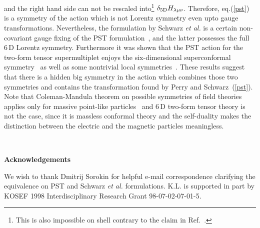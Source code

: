 \documentclass[a4paper,12pt]{article}
\renewcommand{\thesection}{\Roman{section}.}
\renewcommand{\theequation}{\thesection\arabic{equation}}
\begin{document}
and the right hand side can not be rescaled into\footnote{This is also impossible on shell contrary to the claim in Ref.~\cite{9611065}.}  $\delta_{5{\rm D}}H_{\lambda\mu\nu}$.  Therefore,  eq.(\ref{pst}) is  a  symmetry of the action which is not Lorentz symmetry even upto gauge transformations. Nevertheless,  the formulation by Schwarz \textit{et al.} is a certain non-covariant gauge fixing of the PST formulation~\cite{9701037,9701166,9503182,9506109}, and  the latter possesses the full $6\,\mbox{D}$ Lorentz symmetry. Furthermore it was shown that the PST action for the two-form tensor supermultiplet enjoys the six-dimensional superconformal symmetry~\cite{9711161} as well as some nontrivial local  symmetries~\cite{9701037,9710127}.  These results suggest that there is a hidden big symmetry  in the action  which combines those two symmetries and contains the transformation found by Perry and Schwarz~(\ref{pst}).  Note that  Coleman-Mandula theorem on possible symmetries of field theories applies only for massive point-like particles~\cite{PR1591251} and $6\,\mbox{D}$ two-form tensor theory is not the case, since it is massless conformal theory and the self-duality makes the distinction between the electric and the magnetic particles meaningless. \newline









~\newline
~\newline
~\newline
\begin{center}
\large{\textbf{Acknowledgements}}
\end{center}
We wish to thank Dmitrij Sorokin for helpful e-mail correspondence clarifying the equivalence on PST and Schwarz \textit{et al.} formulations. K.L. is supported in part by KOSEF 1998 Interdisciplinary Research Grant 98-07-02-07-01-5.
\newline


\newpage
%


\end{document}
